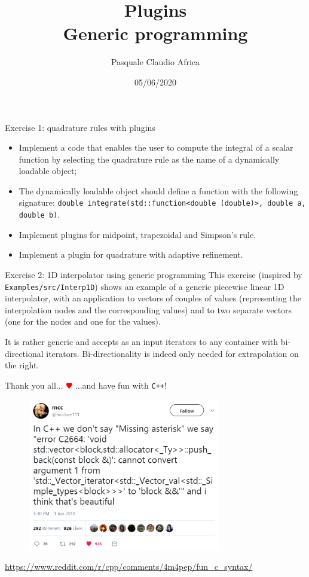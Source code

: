 \documentclass[10pt]{beamer}
\begin{document}
    \title{Plugins \protect\\ Generic programming}
    \author{Pasquale Claudio Africa}
    \date{05/06/2020}

\begin{frame}
    \maketitle
\end{frame}

\begin{frame}{Exercise 1: quadrature rules with plugins}
\begin{itemize}
\item Implement a code that enables the user to compute the integral of a scalar function by selecting the quadrature rule as the name of a dynamically loadable object;
\item The dynamically loadable object should define a function with the following signature:
\texttt{double integrate(std::function<double (double)>, double a, double b)}.
\item Implement plugins for midpoint, trapezoidal and Simpson's rule.
\item Implement a plugin for quadrature with adaptive refinement.
\end{itemize}
\end{frame}


\begin{frame}{Exercise 2: 1D interpolator using generic programming}
This exercise (inspired by \texttt{Examples/src/Interp1D}) shows an example of a generic piecewise linear 1D interpolator, with an application to
vectors of couples of values (representing the interpolation nodes and the corresponding values) and to two separate vectors (one for the nodes and one for the values).

It is rather generic and accepts as an input iterators to any container with bi-directional iterators. Bi-directionality is indeed only needed for extrapolation on the right.
\end{frame}

\begin{frame}{Thank you all... \textcolor{red}{\(\varheart\)}}
...and have fun with \texttt{C++}!
\begingroup
\begin{figure}
\centering
\includegraphics[width=0.75\textwidth]{meme_c++.png}
\end{figure}
\url{https://www.reddit.com/r/cpp/comments/4m4pep/fun_c_syntax/}
\endgroup
\end{frame}
\end{document}
